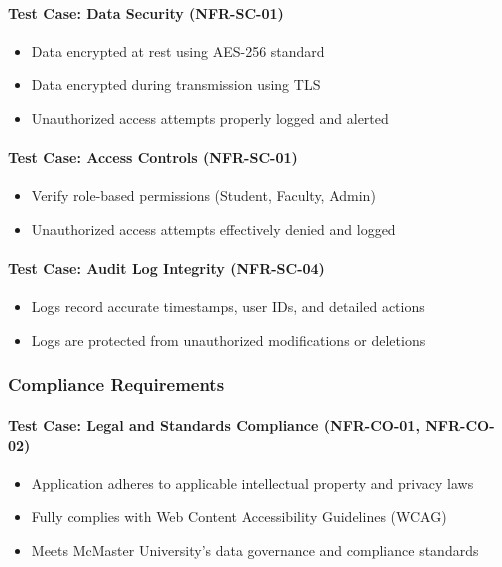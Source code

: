 \documentclass[12pt, titlepage]{article}
\begin{document}
\paragraph{Test Case: Data Security (NFR-SC-01)}
\begin{itemize}
    \item Data encrypted at rest using AES-256 standard
    \item Data encrypted during transmission using TLS
    \item Unauthorized access attempts properly logged and alerted
\end{itemize}

\paragraph{Test Case: Access Controls (NFR-SC-01)}
\begin{itemize}
    \item Verify role-based permissions (Student, Faculty, Admin)
    \item Unauthorized access attempts effectively denied and logged
\end{itemize}

\paragraph{Test Case: Audit Log Integrity (NFR-SC-04)}
\begin{itemize}
    \item Logs record accurate timestamps, user IDs, and detailed actions
    \item Logs are protected from unauthorized modifications or deletions
\end{itemize}

\subsubsection{Compliance Requirements}

\paragraph{Test Case: Legal and Standards Compliance (NFR-CO-01, NFR-CO-02)}
\begin{itemize}
    \item Application adheres to applicable intellectual property and privacy laws
    \item Fully complies with Web Content Accessibility Guidelines (WCAG)
    \item Meets McMaster University's data governance and compliance standards
\end{itemize}
\end{document}
